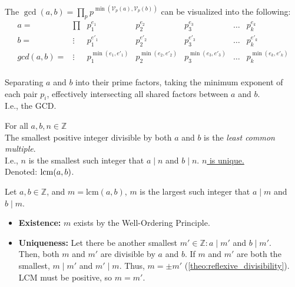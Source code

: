 \begin{Proof}

    \label{proof:gcd_abstracted}

    The $\gcd(a,b) = \prod_{p} p^{\min(\mathcal{V}_p(a),\mathcal{V}_p(b))}$ can be visualized into the following:
    \[
    \begin{array}{ccc|c|c|c|c}
    
    a=&\prod&p_1^{e_1} & p_2^{e_2} & p_3^{e_3} & \dots & p_k^{e_k} \\
    b=&\vdots&p_1^{e'_1} & p_2^{e'_2} & p_3^{e'_3} & \dots & p_k^{e'_k} \\
    \hline
    gcd(a,b)=&\vdots&p_1^{\min(e_1, e'_1)} & p_2^{\min(e_2, e'_2)} & p_3^{\min(e_3, e'_3)} & \dots & p_k^{\min(e_k, e'_k)} \\

    \end{array}
    \]

    \noindent
    Separating $a$ and $b$ into their prime factors, taking the minimum exponent of each pair $p_i$,
    effectively intersecting all shared factors between $a$ and $b$.\\
    
    \noindent
    I.e., the GCD.

\end{Proof}

\begin{Def}

    For all $a,b,n\in\mathbb{Z}$\\
    The smallest positive integer divisible by both $a$ and $b$ is the \textit{least common multiple}.\\
    I.e., $n$ is the smallest such integer that $a\mid n$ and $b\mid n$. \underline{$n$ is unique.}\\

    \noindent
    Denoted: $\operatorname{lcm}(a,b)$.
\end{Def}


\begin{Proof}

    \label{proof:lcm_existence_uniqueness}

    Let $a,b\in\mathbb{Z}$, and $m=\text{lcm}(a,b)$, $m$ is the largest such integer that $a\mid m$ and $b\mid m$.
    \begin{itemize}
        \item  \textbf{Existence:} $m$ exists by the Well-Ordering Principle.
        \item \textbf{Uniqueness:} Let there be another smallest $m'\in\mathbb{Z}:a\mid m'$ and $b\mid m'$.\\
        Then, both $m$ and $m'$ are divisible by $a$ and $b$. If $m$ and $m'$ are both the smallest, $m \mid m'$ and $m' \mid m$. Thus, $m=\pm m'$ (\ref{theo:reflexive_divisibility}). LCM must be positive, so $m = m'$.
    \end{itemize}
\end{Proof}

